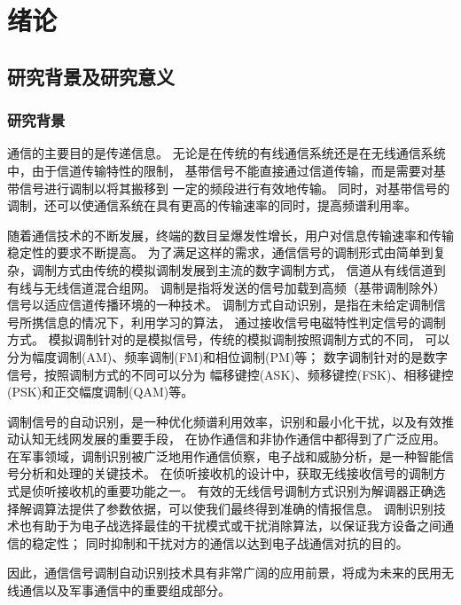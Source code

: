 \chapter{绪论}
\section{研究背景及研究意义}

\subsection{研究背景}
通信的主要目的是传递信息。 
无论是在传统的有线通信系统还是在无线通信系统中，由于信道传输特性的限制，
基带信号不能直接通过信道传输，而是需要对基带信号进行调制以将其搬移到 一定的频段进行有效地传输。
同时，对基带信号的调制，还可以使通信系统在具有更高的传输速率的同时，提高频谱利用率。\par

随着通信技术的不断发展，终端的数目呈爆发性增长，用户对信息传输速率和传输稳定性的要求不断提高。
为了满足这样的需求，通信信号的调制形式由简单到复杂，调制方式由传统的模拟调制发展到主流的数字调制方式，
信道从有线信道到有线与无线信道混合组网。
调制是指将发送的信号加载到高频（基带调制除外）信号以适应信道传播环境的一种技术。
调制方式自动识别，是指在未给定调制信号所携信息的情况下，利用学习的算法，
通过接收信号电磁特性判定信号的调制方式。
模拟调制针对的是模拟信号，传统的模拟调制按照调制方式的不同，
可以分为幅度调制(AM)、频率调制(FM)和相位调制(PM)等；
数字调制针对的是数字信号，按照调制方式的不同可以分为
幅移键控(ASK)、频移键控(FSK)、相移键控(PSK)和正交幅度调制(QAM)等。 \par

调制信号的自动识别，是一种优化频谱利用效率，识别和最小化干扰，以及有效推动认知无线网发展的重要手段，
在协作通信和非协作通信中都得到了广泛应用\cite{nandi1995automatic}。
在军事领域，调制识别被广泛地用作通信侦察，电子战和威胁分析，是一种智能信号分析和处理的关键技术。
在侦听接收机的设计中，获取无线接收信号的调制方式是侦听接收机的重要功能之一。
有效的无线信号调制方式识别为解调器正确选择解调算法提供了参数依据，可以使我们最终得到准确的情报信息。
调制识别技术也有助于为电子战选择最佳的干扰模式或干扰消除算法，以保证我方设备之间通信的稳定性；
同时抑制和干扰对方的通信以达到电子战通信对抗的目的。\par

因此，通信信号调制自动识别技术具有非常广阔的应用前景，将成为未来的民用无线通信以及军事通信中的重要组成部分。\par

